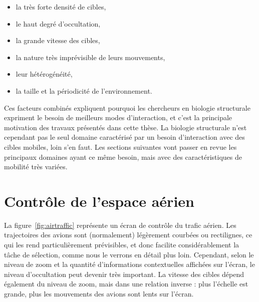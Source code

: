 	\begin{itemize}
		\item la très forte densité de cibles,
		\item le haut degré d'occultation,
		\item la grande vitesse des cibles,
		\item la nature très imprévisible de leurs mouvements,
		\item leur hétérogénéité,
		\item la taille et la périodicité de l'environnement.
	\end{itemize}
	
	Ces facteurs combinés expliquent pourquoi les chercheurs en biologie structurale expriment le besoin de meilleurs modes d'interaction, et c'est la principale motivation des travaux présentés dans cette thèse. La biologie structurale n'est cependant pas le seul domaine caractérisé par un besoin d'interaction avec des cibles mobiles, loin s'en faut. Les sections suivantes vont passer en revue les principaux domaines ayant ce même besoin, mais avec des caractéristiques de mobilité très variées.
	
	\section{Contrôle de l'espace aérien}
 La figure~\ref{fig:airtraffic} représente un écran de contrôle du trafic aérien. Les trajectoires des avions sont (normalement) légèrement courbées ou rectilignes, ce qui les rend particulièrement prévisibles, et donc facilite considérablement la tâche de sélection, comme nous le verrons en détail plus loin. Cependant, selon le niveau de zoom et la quantité d'informations contextuelles affichées sur l'écran, le niveau d'occultation peut devenir très important. La vitesse des cibles dépend également du niveau de zoom, mais dans une relation inverse : plus l'échelle est grande, plus les mouvements des avions sont lents sur l'écran.
	
